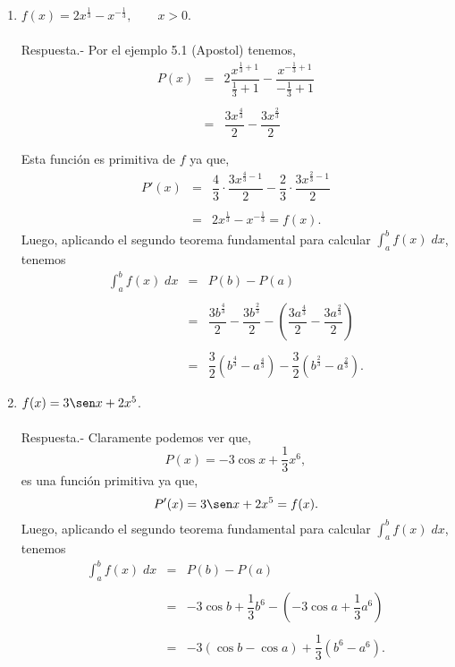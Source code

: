 \begin{enumerate}[\bfseries 1.]
    \item $f(x)=2x^{\frac{1}{3}}-x^{-\frac{1}{3}}, \qquad x>0$.\\\\
	Respuesta.-\; Por el ejemplo 5.1 (Apostol) tenemos,
	$$\begin{array}{rcl}
	    P(x)&=&2\dfrac{x^{\frac{1}{3}+1}}{\frac{1}{3}+1}-\dfrac{x^{-\frac{1}{3}+1}}{-\frac{1}{3}+1}\\\\
		&=&\dfrac{3x^{\frac{4}{3}}}{2}-\dfrac{3x^{\frac{2}{3}}}{2}\\\\
	\end{array}$$
	Esta función es primitiva de $f$ ya que,
	$$\begin{array}{rcl}
	    P'(x)&=&\dfrac{4}{3}\cdot \dfrac{3x^{\frac{4}{3}-1}}{2}-\dfrac{2}{3}\cdot\dfrac{3x^{\frac{2}{3}-1}}{2}\\\\
		 &=&2x^{\frac{1}{3}}-x^{-\frac{1}{3}}=f(x).
	\end{array}$$
	Luego, aplicando el segundo teorema fundamental para calcular $\int_a^b f(x)\; dx$, tenemos
	$$\begin{array}{rcl}
	    \displaystyle\int_a^b f(x)\; dx &=& P(b)-P(a)\\\\
					    &=& \dfrac{3b^{\frac{4}{3}}}{2}-\dfrac{3b^{\frac{2}{3}}}{2}-\left(\dfrac{3a^{\frac{4}{3}}}{2}-\dfrac{3a^{\frac{2}{3}}}{2}\right)\\\\
					    &=&\dfrac{3}{2}\left(b^{\frac{4}{3}}-a^{\frac{4}{3}}\right)-\dfrac{3}{2}\left(b^{\frac{2}{3}}-a^{\frac{2}{3}}\right).
	\end{array}$$
	\vspace{0.5cm}

    \item $f(x)=3\sen x + 2x^5$.\\\\
	Respuesta.-\; Claramente podemos ver que,
	$$P(x)=-3\cos x + \dfrac{1}{3}x^6,$$
	es una función primitiva ya que,
	$$P'(x)=3\sen x + 2x^5 = f(x).$$
	Luego, aplicando el segundo teorema fundamental para calcular $\int_a^b f(x)\; dx$, tenemos
	$$\begin{array}{rcl}
	    \displaystyle\int_a^b f(x)\; dx &=& P(b)-P(a)\\\\
					    &=& -3\cos b + \dfrac{1}{3}b^6 -\left(-3\cos a + \dfrac{1}{3}a^6\right)\\\\
					    &=&-3(\cos b - \cos a) + \dfrac{1}{3}\left(b^6-a^6\right).
	\end{array}$$
	\vspace{0.5cm}


\end{enumerate}
